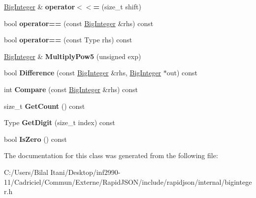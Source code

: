 \begin{DoxyCompactItemize}
\item 
\hyperlink{classinternal_1_1_big_integer}{Big\+Integer} \& {\bfseries operator$<$$<$=} (size\+\_\+t shift)\hypertarget{classinternal_1_1_big_integer_a48b12ef4676f19290dfd5816a4ef4a88}{}\label{classinternal_1_1_big_integer_a48b12ef4676f19290dfd5816a4ef4a88}

\item 
bool {\bfseries operator==} (const \hyperlink{classinternal_1_1_big_integer}{Big\+Integer} \&rhs) const \hypertarget{classinternal_1_1_big_integer_a567ecda3009de20400a2af649fb87e60}{}\label{classinternal_1_1_big_integer_a567ecda3009de20400a2af649fb87e60}

\item 
bool {\bfseries operator==} (const Type rhs) const \hypertarget{classinternal_1_1_big_integer_a329eddac1b724f82d56af2ee2c8abcc4}{}\label{classinternal_1_1_big_integer_a329eddac1b724f82d56af2ee2c8abcc4}

\item 
\hyperlink{classinternal_1_1_big_integer}{Big\+Integer} \& {\bfseries Multiply\+Pow5} (unsigned exp)\hypertarget{classinternal_1_1_big_integer_a98a13f169c27d1acfa57054f37c61763}{}\label{classinternal_1_1_big_integer_a98a13f169c27d1acfa57054f37c61763}

\item 
bool {\bfseries Difference} (const \hyperlink{classinternal_1_1_big_integer}{Big\+Integer} \&rhs, \hyperlink{classinternal_1_1_big_integer}{Big\+Integer} $\ast$out) const \hypertarget{classinternal_1_1_big_integer_a5741304ce36392adeef716e78b384b61}{}\label{classinternal_1_1_big_integer_a5741304ce36392adeef716e78b384b61}

\item 
int {\bfseries Compare} (const \hyperlink{classinternal_1_1_big_integer}{Big\+Integer} \&rhs) const \hypertarget{classinternal_1_1_big_integer_afd8b15480df5003ee6b6e1b8ecbf5f45}{}\label{classinternal_1_1_big_integer_afd8b15480df5003ee6b6e1b8ecbf5f45}

\item 
size\+\_\+t {\bfseries Get\+Count} () const \hypertarget{classinternal_1_1_big_integer_a720114cef0871c9f9c3c6a5f3a66e66a}{}\label{classinternal_1_1_big_integer_a720114cef0871c9f9c3c6a5f3a66e66a}

\item 
Type {\bfseries Get\+Digit} (size\+\_\+t index) const \hypertarget{classinternal_1_1_big_integer_a92c6854f2388875374cfb9801bea0cc8}{}\label{classinternal_1_1_big_integer_a92c6854f2388875374cfb9801bea0cc8}

\item 
bool {\bfseries Is\+Zero} () const \hypertarget{classinternal_1_1_big_integer_a99cf9cb87491a583c6b7614b0c8654fe}{}\label{classinternal_1_1_big_integer_a99cf9cb87491a583c6b7614b0c8654fe}

\end{DoxyCompactItemize}


The documentation for this class was generated from the following file\+:\begin{DoxyCompactItemize}
\item 
C\+:/\+Users/\+Bilal Itani/\+Desktop/inf2990-\/11/\+Cadriciel/\+Commun/\+Externe/\+Rapid\+J\+S\+O\+N/include/rapidjson/internal/biginteger.\+h\end{DoxyCompactItemize}
